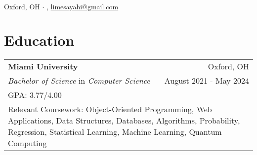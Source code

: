 \documentclass[letterpaper,8pt]{article} %
\begin{document}
\pagestyle{empty} %


\par
{\centering{\LARGE \setmainfont{EB Garamond}{Emil Sayahi}}\\

\footnotesize{
Oxford, OH
$\cdot$
\href{tel:+1-513-484-0972}{\color{black}{+1 (513) 484-0972}}, \href{mailto:limesayahi@gmail.com}{\color{black}limesayahi@gmail.com}\\
}} %




\section{Education}

\footnotesize{
\begin{tabular*}{\linewidth}{@{\extracolsep{\fill}} lr }
\textbf{Miami University} & Oxford, OH\\
\emph{Bachelor of Science} in \emph{Computer Science} & August 2021 - May 2024\\
\multicolumn{2}{p{\linewidth}}{GPA\@: 3.77/4.00}\\
\multicolumn{2}{p{\linewidth}}{Relevant Coursework: Object-Oriented Programming, Web Applications, Data Structures, Databases, Algorithms, Probability, Regression, Statistical Learning, Machine Learning, Quantum Computing}\\
\end{tabular*}}
\end{document}
